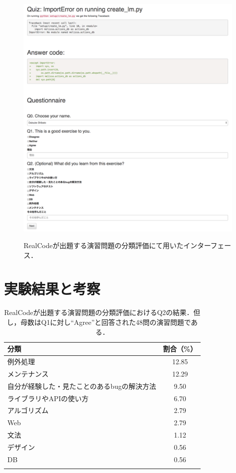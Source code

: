 \begin{figure}[H]
　\centering
  \includegraphics[width=1.0\columnwidth]{20181218-lab-study-interface-all.png}
  \caption{RealCodeが出題する演習問題の分類評価にて用いたインターフェース．}
  \label{fig:lab-study}
\end{figure}

\section{実験結果と考察}

\begin{table}[b]
  \centering
  \caption{RealCodeが出題する演習問題の分類評価におけるQ2の結果．但し，母数はQ1に対し``Agree''と回答された48問の演習問題である．}
  \label{table:lab-study-q2-result}
  \begin{tabular}{ l | c } \Xhline{3\arrayrulewidth}
      分類 & 割合（\%） \\ \hline \hline
      例外処理 & 12.85 \\
      メンテナンス & 12.29  \\
      自分が経験した・見たことのあるbugの解決方法 & 9.50 \\
      ライブラリやAPIの使い方 & 6.70 \\
      アルゴリズム & 2.79 \\
      Web & 2.79 \\
      文法 & 1.12 \\  
      デザイン & 0.56 \\
      DB & 0.56 \\
      \Xhline{3\arrayrulewidth}
  \end{tabular}
\end{table}

